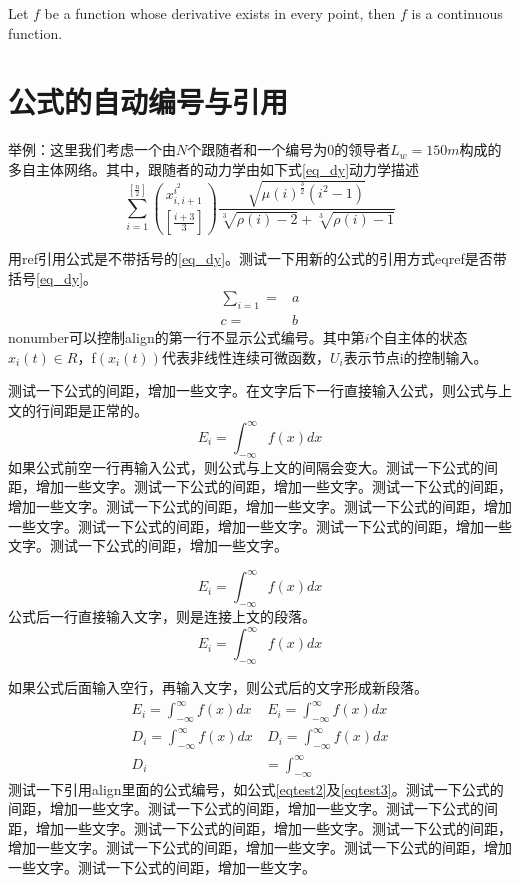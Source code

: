 \begin{theorem}
  Let \(f\) be a function whose derivative exists in every point, then \(f\)  is a continuous function.
\end{theorem}


\section{公式的自动编号与引用}
举例：这里我们考虑一个由$N$个跟随者和一个编号为0的领导者$L_w = 150 m$构成的多自主体网络。其中，跟随者的动力学由如下式\ref{eq_dy}动力学描述
\begin{equation}
  \sum_{i=1}^{\left[ \frac{n}{2}\right]} \binom{x_{i,i+1}^{i^2}}
  {\left[\frac{i+3}{3} \right]} \frac{\sqrt{\mu(i)^{\frac{3}{2}}
  (i^2-1)}} {\sqrt[3]{\rho(i)-2}+\sqrt[3]{\rho(i)-1}}
  \label{eq_dy}
\end{equation}

用ref引用公式是不带括号的\ref{eq_dy}。测试一下用新的公式的引用方式eqref是否带括号\eqref{eq_dy}。
\begin{align}
  \sum_{i=1} = & a \nonumber \\
            c = & b
\end{align}
nonumber可以控制align的第一行不显示公式编号。其中第$i$个自主体的状态$x_i (t)\in R$，f$(x_i (t))$代表非线性连续可微函数，$U_i$表示节点i的控制输入。

测试一下公式的间距，增加一些文字。在文字后下一行直接输入公式，则公式与上文的行间距是正常的。
\begin{equation}
  E_i=\int_{-\infty}^{\infty} f(x)dx
\end{equation}
如果公式前空一行再输入公式，则公式与上文的间隔会变大。测试一下公式的间距，增加一些文字。测试一下公式的间距，增加一些文字。测试一下公式的间距，增加一些文字。测试一下公式的间距，增加一些文字。测试一下公式的间距，增加一些文字。测试一下公式的间距，增加一些文字。测试一下公式的间距，增加一些文字。测试一下公式的间距，增加一些文字。

\begin{equation}
  E_i=\int_{-\infty}^{\infty} f(x)dx
\end{equation}
公式后一行直接输入文字，则是连接上文的段落。
\begin{equation}
  E_i=\int_{-\infty}^{\infty} f(x)dx
\end{equation}

如果公式后面输入空行，再输入文字，则公式后的文字形成新段落。
\begin{align}
  E_i=\int_{-\infty}^{\infty} f(x)dx & \ E_i=\int_{-\infty}^{\infty} f(x)dx 
  \label{eqtest1} \\
  D_i=\int_{-\infty}^{\infty} f(x)dx & \ D_i=\int_{-\infty}^{\infty} f(x)dx 
  \label{eqtest2} \\
  D_i & =\int_{-\infty}^{\infty}
  \label{eqtest3}
\end{align}
测试一下引用align里面的公式编号，如公式\eqref{eqtest2}及\eqref{eqtest3}。测试一下公式的间距，增加一些文字。测试一下公式的间距，增加一些文字。测试一下公式的间距，增加一些文字。测试一下公式的间距，增加一些文字。测试一下公式的间距，增加一些文字。测试一下公式的间距，增加一些文字。测试一下公式的间距，增加一些文字。测试一下公式的间距，增加一些文字。

